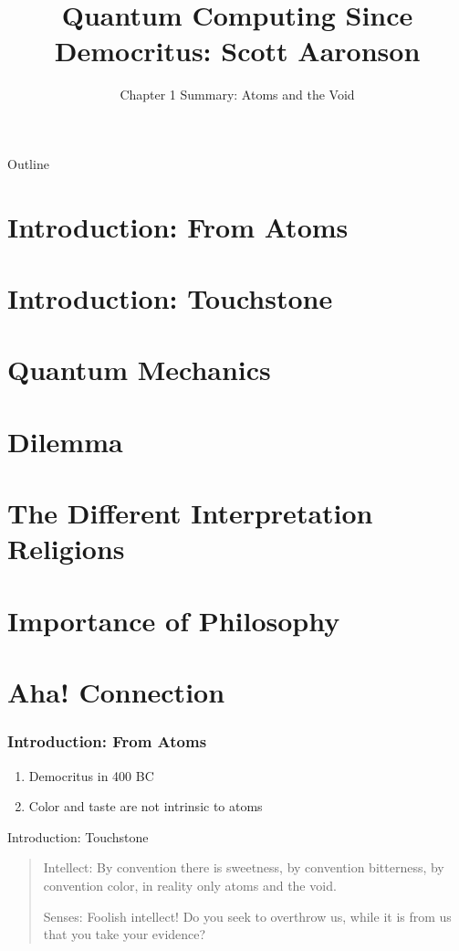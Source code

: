 \documentclass{beamer}
\title{Quantum Computing Since Democritus: Scott Aaronson}
\author{Chapter 1 Summary: Atoms and the Void}
\institute{Saumya Chaturvedi}
\begin{document}
\begin{frame}
    \titlepage 
\end{frame}

\begin{frame}{Outline}
    \tableofcontents
\end{frame}

\section{Introduction: From Atoms}
\section{Introduction: Touchstone}
\section{Quantum Mechanics}
\section{Dilemma}
\section{The Different Interpretation Religions}
\section{Importance of Philosophy}
\section{Aha! Connection}

\begin{frame}
\frametitle{Introduction: From Atoms}
\begin{enumerate}

   \item Democritus in 400 BC
   \item Color and taste are not intrinsic to atoms

\end{enumerate}

\end{frame}

\begin{frame}{Introduction: Touchstone}
    \begin{quote}
    Intellect: By convention there is sweetness, by convention bitterness, by convention color, in reality only atoms and the void.
    

    Senses: Foolish intellect! Do you seek to overthrow us, while it is from us that you take your evidence?
\end{quote}
\end{frame}
\end{document}
